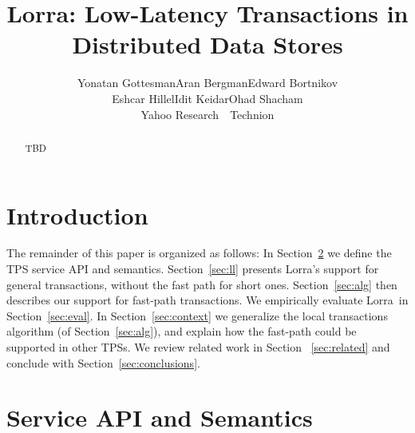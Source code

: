 \documentclass[letterpaper,twocolumn,10pt]{article}
\newcommand{\inred}[1]{{\color{red}{#1}}}
\newcommand{\Idit}[1]{[[\inred{Idit: #1}]]}
\newcommand{\tb}{\hspace{5mm}}
\newcommand{\sys}{Lorra}
\begin{document}
\date{}

\title{\Large \bf\sys: Low-Latency Transactions in Distributed Data Stores}

\author{
{\rm Yonatan Gottesman\footnotemark[1]\tb Aran Bergman\footnotemark[2]\tb   Edward Bortnikov\footnotemark[1] }\\ 
{\rm Eshcar Hillel\footnotemark[1]\tb Idit Keidar\footnotemark[1] \footnotemark[2]\tb Ohad Shacham\footnotemark[1]}\\
	\footnotemark[1] Yahoo Research\ \ \footnotemark[2] Technion
} %


\maketitle




\begin{abstract}
TBD
\end{abstract}


\section{Introduction} \label{sec:intro}
%
 

The remainder of this paper is organized as follows:
In Section~\ref{sec:api} we define the TPS service  API and semantics. 
Section~\ref{sec:ll} presents \sys's support for general transactions, without the fast path for short ones. 
Section~\ref{sec:alg} then describes our support for fast-path  transactions.  
We empirically evaluate \sys\ in Section~\ref{sec:eval}.
In Section~\ref{sec:context} we generalize the local transactions algorithm
(of Section~\ref{sec:alg}), and explain how the fast-path could be supported in other TPSs. 
 We review related work in Section ~\ref{sec:related} and conclude with Section~\ref{sec:conclusions}.

\section{Service API and Semantics} \label{sec:api}

\end{document}
